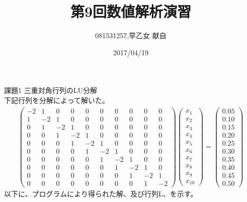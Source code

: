 \documentclass[]{jsarticle}
\title{第9回数値解析演習}
\author{081531257,早乙女 献自}
\date{2017/04/19}
\begin{document}
\maketitle
課題1 三重対角行列のLU分解\\
下記行列を分解によって解いた。\\
\begin{eqnarray}
\left(
 \begin{array}{rrrrrrrrrr}
-2 & 1 & 0 & 0 & 0 & 0 & 0 & 0 & 0 & 0\\
1 & -2 & 1 & 0 & 0 & 0 & 0 & 0 & 0 & 0\\
0 & 1 & -2 & 1 & 0 & 0 & 0 & 0 & 0 & 0\\
0 & 0 & 1 & -2 & 1 & 0 & 0 & 0 & 0 & 0\\
0 & 0 & 0 & 1 & -2 & 1 & 0 & 0 & 0 & 0\\
0 & 0 & 0 & 0 & 1 & -2 & 1 & 0 & 0 & 0\\
0 & 0 & 0 & 0 & 0 & 1 & -2 & 1 & 0 & 0\\
0 & 0 & 0 & 0 & 0 & 0 & 1 & -2 & 1 & 0\\
0 & 0 & 0 & 0 & 0 & 0 & 0 & 1 & -2 & 1\\
0 & 0 & 0 & 0 & 0 & 0 & 0 & 0 & 1 & -2
\end{array}
\right)
\left(
\begin{array}{r}
 x_1\\
x_2\\
x_3\\
x_4\\
x_5\\
x_6\\
x_7\\
x_8\\
x_9\\
x_{10}
\end{array}
\right) = 
\left(
\begin{array}{r}
0.05\\
0.10\\
0.15\\
0.20\\
0.25\\
0.30\\
0.35\\
0.40\\
0.45\\
0.50
\end{array}
\right)
\nonumber
\end{eqnarray}
以下に、プログラムにより得られた解、及び行列L、を示す。
\end{document}
